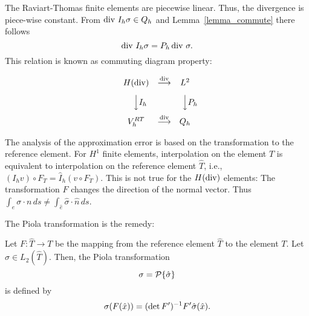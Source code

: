 The Raviart-Thomas finite elements are piecewise linear. Thus, the
divergence is piece-wise constant. From $\operatorname{div} \, I_h \sigma \in Q_h$
and Lemma~\ref{lemma_commute} there follows
$$
\operatorname{div} \, I_h \sigma = P_h \operatorname{div} \, \sigma.
$$
This relation is known as commuting diagram property:


\begin{equation}
\begin{array}{ccc}
H(\opdiv)       &      \stackrel{\opdiv}{\longrightarrow}    & 
L^2                                                                                    \\[8pt]
\Big\downarrow  \vcenter{ \rlap{$I_h$}}  &                  &
\Big\downarrow  \vcenter{ \rlap{$P_h$}}                             \\[8pt]
V_h^{RT}                   &      
\stackrel{\opdiv}{\longrightarrow}          &
 Q_h    
\end{array}
\label{diagram2}
\end{equation}


\bigskip

The analysis of the approximation error is based on the transformation
to the reference element. For $H^1$ finite elements, interpolation on
the element $T$ is equivalent to interpolation on the reference
element $\widehat T$, i.e., 
$(I_h v) \circ F_T = \hat I_h (v \circ F_T)$. This is not
true for the $H(\operatorname{div})$ elements: The transformation $F$ changes
the direction of the normal vector. Thus 
$\int_{e} \sigma \cdot n \, ds \neq \int_{\hat e} \hat \sigma \cdot \hat n \, ds$. 

The Piola transformation is the remedy:
\begin{definition}
Let $F : \widehat T \rightarrow T$ be the mapping from the reference element
$\widehat T$ to the element $T$. Let $\hat \sigma \in L_2(\widehat T)$. Then, the 
Piola transformation 
$$
\sigma = {\cal P} \{ \hat \sigma \}
$$
is defined by
$$
\sigma (F (\hat x)) = (\operatorname{det} F^\prime)^{-1} F^\prime \hat \sigma
(\hat x).
$$
\end{definition}

